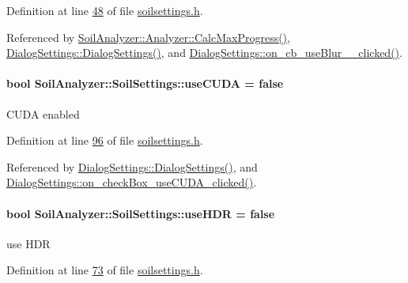 Definition at line \hyperlink{soilsettings_8h_source_l00048}{48} of file \hyperlink{soilsettings_8h_source}{soilsettings.\+h}.



Referenced by \hyperlink{analyzer_8cpp_source_l00112}{Soil\+Analyzer\+::\+Analyzer\+::\+Calc\+Max\+Progress()}, \hyperlink{dialogsettings_8cpp_source_l00005}{Dialog\+Settings\+::\+Dialog\+Settings()}, and \hyperlink{dialogsettings_8cpp_source_l00376}{Dialog\+Settings\+::on\+\_\+cb\+\_\+use\+Blur\+\_\+\_\+clicked()}.

\hypertarget{class_soil_analyzer_1_1_soil_settings_adfeabd89b897cf220e3575e64c97b4fc}{}
\paragraph[{use\+C\+U\+D\+A}]{\setlength{\rightskip}{0pt plus 5cm}bool Soil\+Analyzer\+::\+Soil\+Settings\+::use\+C\+U\+D\+A = false}\label{class_soil_analyzer_1_1_soil_settings_adfeabd89b897cf220e3575e64c97b4fc}
C\+U\+D\+A enabled 

Definition at line \hyperlink{soilsettings_8h_source_l00096}{96} of file \hyperlink{soilsettings_8h_source}{soilsettings.\+h}.



Referenced by \hyperlink{dialogsettings_8cpp_source_l00005}{Dialog\+Settings\+::\+Dialog\+Settings()}, and \hyperlink{dialogsettings_8cpp_source_l00303}{Dialog\+Settings\+::on\+\_\+check\+Box\+\_\+use\+C\+U\+D\+A\+\_\+clicked()}.

\hypertarget{class_soil_analyzer_1_1_soil_settings_a6851d04a1d2a5acbc99c6d9665c40edf}{}
\paragraph[{use\+H\+D\+R}]{\setlength{\rightskip}{0pt plus 5cm}bool Soil\+Analyzer\+::\+Soil\+Settings\+::use\+H\+D\+R = false}\label{class_soil_analyzer_1_1_soil_settings_a6851d04a1d2a5acbc99c6d9665c40edf}
use H\+D\+R 

Definition at line \hyperlink{soilsettings_8h_source_l00073}{73} of file \hyperlink{soilsettings_8h_source}{soilsettings.\+h}.



